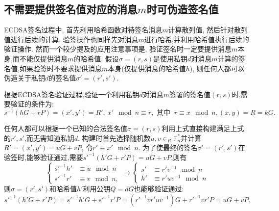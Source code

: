 \documentclass{article}
\newcommand{\F}{\mathbb{F}}
\begin{document}
\subsection{不需要提供签名值对应的消息$m$时可伪造签名值}

ECDSA签名过程中, 首先利用哈希函数对待签名消息$m$计算散列值, 然后针对散列值进行后续的计算.
验签操作也同样先对消息$m$进行哈希,并利用哈希值执行后续的验证操作.
然而一个较少提及的应用注意事项是, 验证签名时一定要提供消息$m$本身,而不能仅提供消息$m$的哈希值.
假设$\sigma=(r, s)$是使用私钥$d$对消息$m$计算的签名值,如果验签时不要求提供消息$m$本身(仅提供消息的哈希值$h$),
则任何人都可以伪造关于私钥$d$的签名值$\sigma'=(r', s')$.

根据ECDSA签名验证过程,验证一个利用私钥$d$对消息$m$签署的签名值$(r,s)$时,需要验证的条件为:
$$s^{-1}(hG+rP) = (x', y') = R', \  x' \mod n \equiv r, \text{ 其中 }\  r \equiv x \mod n, (x,y) = R = kG.$$

任何人都可以根据一个已知的合法签名值$\sigma=(r,s)$利用上式直接构建满足上式的$r', s'$,而无需知道私钥$d$.
构建时首先选择随机数$u, v\in_R\F_n^*$并计算$R' = (x', y') = uG + vP$, 令$r' \equiv x' \mod n$.
为了使最终的签名$\sigma' = (r', s')$在验签时,能够验证通过,需要$s'^{-1}(h'G  + r'P) = uG + vP$,则有
\begin{equation}\nonumber
\left\{
\begin{array}{ll}
s'^{-1}h' & \equiv u \mod n\\
s'^{-1}r' & \equiv v \mod n,
\end{array}
\right.
\rightarrow
\left\{
\begin{array}{ll}
s' & \equiv r'v^{-1} \mod n\\
h' & \equiv r'uv^{-1} \mod n
\end{array}
\right.
\end{equation}
则$\sigma = (r', s')$和哈希值$h'$利用公钥$Q=dG$也能够验证通过:
$$
s'^{-1}(h'G + r'P) = s'^{-1}h' G + s'^{-1}r'P = (r'^{-1}v r'uv^{-1})G + r'^{-1}vr' P  = uG + vP.
$$
\end{document}
